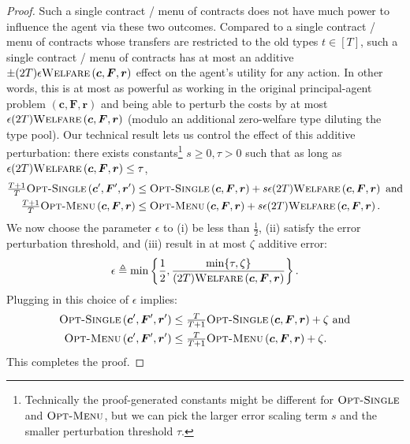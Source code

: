 \documentclass{article}
\newcommand{\joshnote}[1]{}
\newcommand{\costvector}{\bm{c}}
\newcommand{\ForecastTensor}{\bm{F}}
\newcommand{\rewardvector}{\bm{r}}
\newcommand{\PrincipalAgentProblem}{\left(\costvector, \ForecastTensor, \rewardvector\right)}
\newcommand{\PrincipalAgentProblemPrime}{\left(\costvector', \ForecastTensor', \rewardvector'\right)}
\newcommand{\OWelfare}{\textsc{Welfare}}
\newcommand{\OMenu}{\textsc{Opt-Menu}}
\newcommand{\OSingle}{\textsc{Opt-Single}}
\begin{document}
\begin{proof}
  Such a single contract / menu of contracts does not have much power to influence the agent via these two outcomes. Compared to a single contract / menu of contracts whose transfers are restricted to the old types $t \in [T]$, such a single contract / menu of contracts has at most an additive $\pm (2T) \epsilon \OWelfare \PrincipalAgentProblem$ effect on the agent's utility for any action. In other words, this is at most as powerful as working in the original principal-agent problem $\PrincipalAgentProblem$ and being able to perturb the costs by at most $\epsilon (2T) \OWelfare \PrincipalAgentProblem$ (modulo an additional zero-welfare type diluting the type pool). Our technical result  lets us control the effect of this additive perturbation: there exists constants\footnote{Technically the proof-generated constants might be different for $\OSingle$ and $\OMenu$, but we can pick the larger error scaling term $s$ and the smaller perturbation threshold $\tau$.} $s \ge 0, \tau > 0$ such that as long as $\epsilon (2T) \OWelfare \PrincipalAgentProblem \le \tau$,
  \begin{align*}
    \tfrac{T+1}{T} \OSingle \PrincipalAgentProblemPrime &\le \OSingle \PrincipalAgentProblem + s \epsilon (2T) \OWelfare \PrincipalAgentProblem\text{ and} \\
    \tfrac{T+1}{T} \OMenu \PrincipalAgentProblem &\le \OMenu \PrincipalAgentProblem + s \epsilon (2T) \OWelfare \PrincipalAgentProblem\text{.}
  \end{align*}
  We now choose the parameter $\epsilon$ to (i) be less than $\tfrac12$, (ii) satisfy the error perturbation threshold, and (iii) result in at most $\zeta$ additive error:
  \begin{align*}
    \epsilon \triangleq \min \left\{\frac12, \frac{\min\{\tau, \zeta\}}{(2T) \OWelfare \PrincipalAgentProblem} \right\}\text{.}
  \end{align*}
  Plugging in this choice of $\epsilon$ implies:
  \begin{align*}
    \OSingle \PrincipalAgentProblemPrime &\le \tfrac{T}{T+1} \OSingle \PrincipalAgentProblem + \zeta \text{ and} \\
    \OMenu \PrincipalAgentProblemPrime &\le \tfrac{T}{T+1} \OMenu \PrincipalAgentProblem + \zeta \text{.}
  \end{align*}
  This completes the proof.
\end{proof}%
\end{document}
